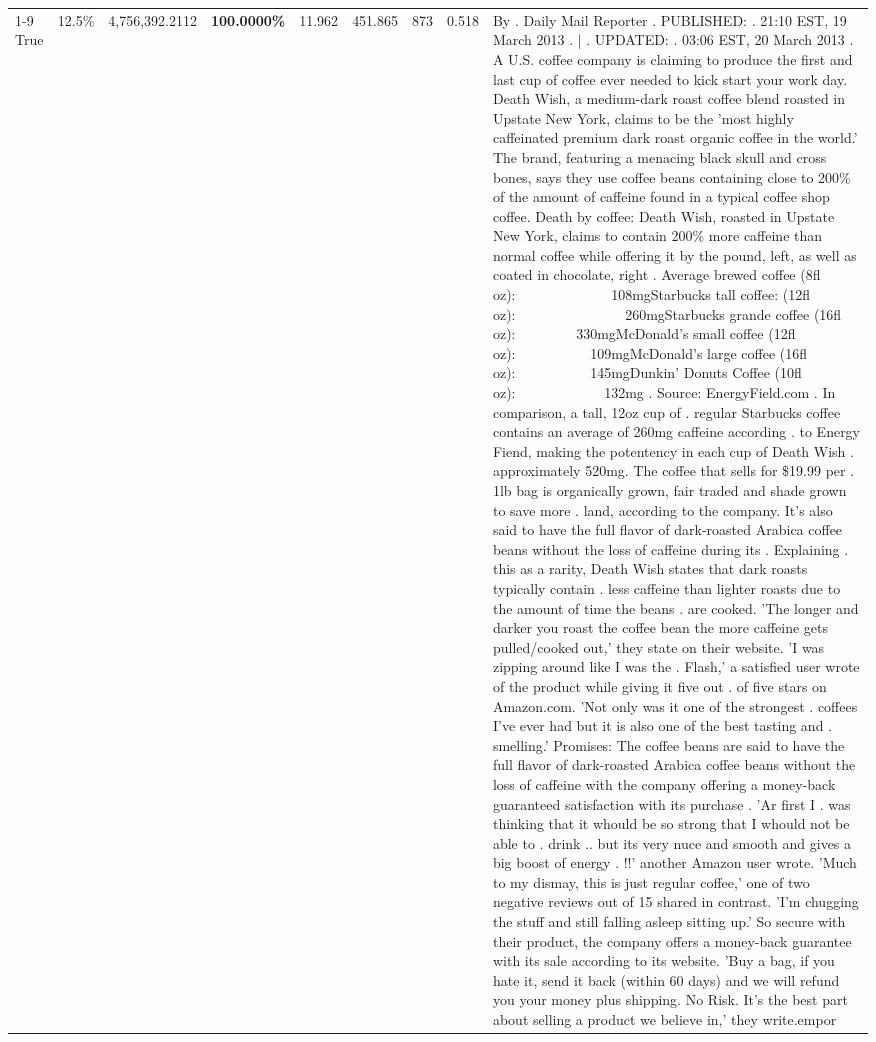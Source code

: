 \begin{table}[H]
{\begin{tabular}{lllrlllll}
\cline{1-9}
True & 12.5\% & 4,756,392.2112 & \bfseries \color{red} 100.0000\% & 11.962 & 451.865 & 873 & 0.518 & By . Daily Mail Reporter . PUBLISHED: . 21:10 EST, 19 March 2013 . | . UPDATED: . 03:06 EST, 20 March 2013 . A U.S. coffee company is claiming to produce the first and last cup of coffee ever needed to kick start your work day. Death Wish, a medium-dark roast coffee blend roasted in Upstate New York, claims to be the 'most highly caffeinated premium dark roast organic coffee in the world.' The brand, featuring a menacing black skull and cross bones, says they use coffee beans containing close to 200\% of the amount of caffeine found in a typical coffee shop coffee. Death by coffee: Death Wish, roasted in Upstate New York, claims to contain 200\% more caffeine than normal coffee while offering it by the pound, left, as well as coated in chocolate, right . Average brewed coffee (8fl oz):              108mgStarbucks tall coffee: (12fl oz):                260mgStarbucks grande coffee (16fl oz):         330mgMcDonald's small coffee (12fl oz):           109mgMcDonald's large coffee (16fl oz):           145mgDunkin' Donuts Coffee (10fl oz):             132mg . Source: EnergyField.com . In comparison, a tall, 12oz cup of . regular Starbucks coffee contains an average of 260mg caffeine according . to Energy Fiend, making the potentency in each cup of Death Wish . approximately 520mg. The coffee that sells for \$19.99 per . 1lb bag is organically grown, fair traded and shade grown to save more . land, according to the company. It's also said to have the full flavor of dark-roasted Arabica coffee beans without the loss of caffeine during its . Explaining . this as a rarity, Death Wish states that dark roasts typically contain . less caffeine than lighter roasts due to the amount of time the beans . are cooked. 'The longer and darker you roast the coffee bean the more caffeine gets pulled/cooked out,' they state on their website. 'I was zipping around like I was the . Flash,' a satisfied user wrote of the product while giving it five out . of five stars on Amazon.com. 'Not only was it one of the strongest . coffees I've ever had but it is also one of the best tasting and . smelling.’ Promises: The coffee beans are said to have the full flavor of dark-roasted Arabica coffee beans without the loss of caffeine with the company offering a money-back guaranteed satisfaction with its purchase . 'Ar first I . was thinking that it whould be so strong that I whould not be able to . drink .. but its very nuce and smooth and gives a big boost of energy . !!' another Amazon user wrote. 'Much to my dismay, this is just regular coffee,' one of two negative reviews out of 15 shared in contrast. 'I'm chugging the stuff and still falling asleep sitting up.' So secure with their product, the company offers a money-back guarantee with its sale according to its website. 'Buy a bag, if you hate it, send it back (within 60 days) and we will refund you your money plus shipping. No Risk. It’s the best part about selling a product we believe in,' they write.empor \\

\end{tabular}}
\end{table}
